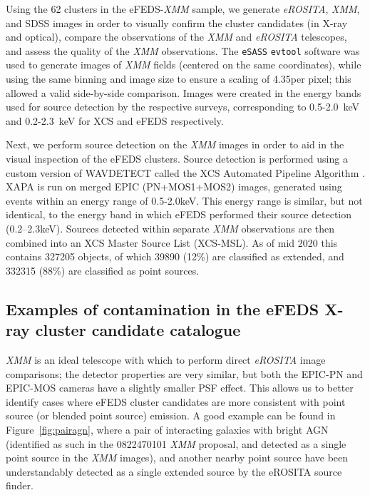 \documentclass[fleqn,usenatbib]{mnras}
\begin{document}
Using the 62 clusters in the eFEDS-{\em XMM} sample, we generate {\em eROSITA}, {\em XMM}, and SDSS images in order to visually confirm the cluster candidates (in X-ray and optical), compare the observations of the {\em XMM} and {\em eROSITA} telescopes, and assess the quality of the {\em XMM} observations. The \texttt{eSASS} \texttt{evtool} software was used to generate images of {\em XMM} fields (centered on the same coordinates), while using the same binning and image size to ensure a scaling of 4.35\arcsec per pixel; this allowed a valid side-by-side comparison. Images were created in the energy bands used for source detection by the respective surveys, corresponding to 0.5-2.0~keV and 0.2-2.3~keV for XCS and eFEDS respectively.

Next, we perform source detection on the {\em XMM} images in order to aid in the visual inspection of the eFEDS clusters.  Source detection is performed using a custom version of WAVDETECT \citep{wavdetect} called the XCS Automated Pipeline Algorithm \citep[XAPA,][]{xcsmethod}. XAPA is run on merged EPIC (PN+MOS1+MOS2) images, generated using events within an energy range of 0.5-2.0keV. This energy range is similar, but not identical, to the energy band in which eFEDS performed their source detection (0.2–2.3keV). Sources detected within separate {\em XMM} observations are then combined into an XCS Master Source List (XCS-MSL). As of mid 2020 this contains 327205 objects, of which 39890 (12\%) are classified as extended, and 332315 (88\%) are classified as point sources.


\subsection{Examples of contamination in the eFEDS X-ray cluster candidate catalogue}

{\em XMM} is an ideal telescope with which to perform direct {\em eROSITA} image comparisons; the detector properties are very similar, but both the EPIC-PN and EPIC-MOS cameras have a slightly smaller PSF effect. This allows us to better identify cases where eFEDS cluster candidates are more consistent with point source (or blended point source) emission. A good example can be found in Figure~\ref{fig:pairagn}, where a pair of interacting galaxies with bright AGN (identified as such in the 0822470101 {\em XMM} proposal, and detected as a single point source in the {\em XMM} images), and another nearby point source have been understandably detected as a single extended source by the eROSITA source finder.
\end{document}
